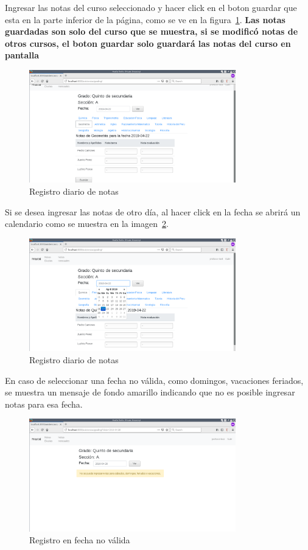 \documentclass[12pt]{article}
\begin{document}
Ingresar las notas del curso seleccionado y hacer click en el boton guardar que esta en la parte
inferior de la p\'agina, como se ve en la figura~\ref{fig:profesor6}.
\textbf{Las notas guardadas son solo del curso que se muestra, si se modific\'o
notas de otros cursos, el boton guardar solo guardar\'a las notas del curso en pantalla}
\begin{figure}[ht]
  \centering
  \includegraphics[width=0.8\textwidth]{images/profesor6.png}
  \caption{Registro diario de notas}
  \label{fig:profesor6}
\end{figure}

\newpage
Si se desea ingresar las notas de otro d\'ia, al hacer click en la fecha se abrir\'a un calendario
como se muestra en la imagen~\ref{fig:profesor2}.
\begin{figure}[ht]
  \centering
  \includegraphics[width=0.8\textwidth]{images/profesor2.png}
  \caption{Registro diario de notas}
  \label{fig:profesor2}
\end{figure}

En caso de seleccionar una fecha no v\'alida, como domingos, vacaciones  feriados, se muestra un
mensaje de fondo amarillo indicando que no es posible ingresar notas para esa fecha.
\begin{figure}[ht]
  \centering
  \includegraphics[width=0.8\textwidth]{images/profesor3.png}
  \caption{Registro en fecha no v\'alida}
  \label{fig:profesor3}
\end{figure}
\end{document}
